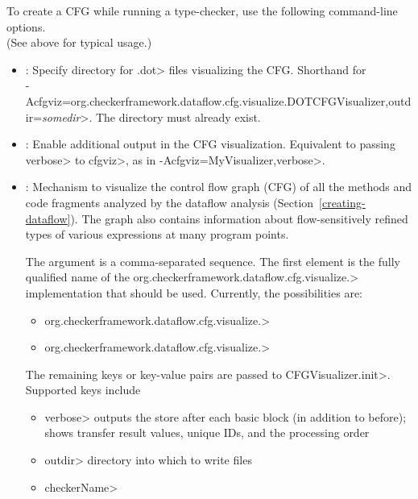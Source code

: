 
To create a CFG while running a type-checker, use the following
command-line options. \\
(See above for typical usage.)

\begin{itemize}

\item {}:
  Specify directory for \<.dot> files visualizing the CFG\@.
  Shorthand for\\
  \<-Acfgviz=org.checkerframework.dataflow.cfg.visualize.DOTCFGVisualizer,outdir=\emph{somedir}>.
  The directory must already exist.

\item {}:
  Enable additional output in the CFG visualization.
  Equivalent to passing \<verbose> to \<cfgviz>, as in
  \<-Acfgviz=MyVisualizer,verbose>.

\item {}:
  Mechanism to visualize the control flow graph (CFG) of
  all the methods and code fragments
  analyzed by the dataflow analysis (Section~\ref{creating-dataflow}).
  The graph also contains information about flow-sensitively refined
  types of various expressions at many program points.

  The argument is a comma-separated sequence.
  The first element is the fully qualified name of the
  \<org.checkerframework.dataflow.cfg.visualize.> implementation
  that should be used. Currently, the possibilities are:
  \begin{itemize}
  \item \<org.checkerframework.dataflow.cfg.visualize.>
  \item \<org.checkerframework.dataflow.cfg.visualize.>
  \end{itemize}
  The remaining keys or key-value pairs are
  passed to \<CFGVisualizer.init>.  Supported keys include
  \begin{itemize}
  \item \<verbose>
    outputs the store after each basic block (in addition to before);
    shows transfer result values, unique IDs, and the processing order
  \item \<outdir> directory into which to write files
  \item \<checkerName>
  \end{itemize}

\end{itemize}


